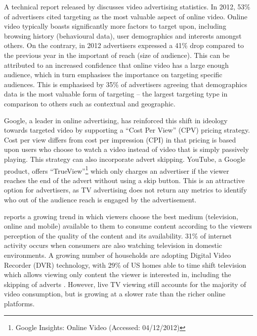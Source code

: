 	A technical report released by \citet{brightroll-report} discusses video advertising statistics. In 2012, 53\% of advertisers cited targeting as the most valuable aspect of online video. Online video typically boasts significantly more factors to target upon, including browsing history (behavioural data), user demographics and interests amongst others. On the contrary, in 2012 advertisers expressed a 41\% drop compared to the previous year in the important of reach (size of audience). This can be attributed to an increased confidence that online video has a large enough audience, which in turn emphasises the importance on targeting specific audiences. This is emphasised by 35\% of advertisers agreeing that demographics data is the most valuable form of targeting -- the largest targeting type in comparison to others such as contextual and geographic.


	Google, a leader in online advertising, has reinforced this shift in ideology towards targeted video by supporting a ``Cost Per View'' (CPV) pricing strategy. Cost per view differs from cost per impression (CPI) in that pricing is based upon users who choose to watch a video instead of video that is simply passively playing. This strategy can also incorporate advert skipping. YouTube, a Google product, offers ``TrueView''\footnote{Google Insights: Online Video  (Accessed: 04/12/2012)} which only charges an advertiser if the viewer reaches the end of the advert without using a skip button. This is an attractive option for advertisers, as TV advertising does not return any metrics to identify who out of the audience reach is engaged by the advertisement.

	\citet{three-screen} reports a growing trend in which viewers choose the best medium (television, online and mobile) available to them to consume content according to the viewers perception of the quality of the content and its availability. 31\% of internet activity occurs when consumers are also watching television in domestic environments. A growing number of households are adopting Digital Video Recorder (DVR) technology, with 29\% of US homes able to time shift television which allows viewing only content the viewer is interested in, including the skipping of adverts \citep{gal2006targeted}. However, live TV viewing still accounts for the majority of video consumption, but is growing at a slower rate than the richer online platforms.


